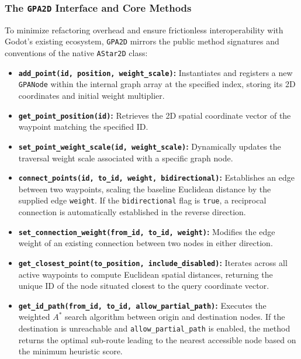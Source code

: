\subsubsection{The \texttt{GPA2D} Interface and Core Methods}
To minimize refactoring overhead and ensure frictionless interoperability with Godot's existing ecosystem, \texttt{GPA2D} mirrors the public method signatures and conventions of the native \texttt{AStar2D} class:

\begin{itemize}
    \item \textbf{\texttt{add\_point(id, position, weight\_scale)}:} Instantiates and registers a new \texttt{GPANode} within the internal graph array at the specified index, storing its 2D coordinates and initial weight multiplier.
    \item \textbf{\texttt{get\_point\_position(id)}:} Retrieves the 2D spatial coordinate vector of the waypoint matching the specified ID.
    \item \textbf{\texttt{set\_point\_weight\_scale(id, weight\_scale)}:} Dynamically updates the traversal weight scale associated with a specific graph node.
    \item \textbf{\texttt{connect\_points(id, to\_id, weight, bidirectional)}:} Establishes an edge between two waypoints, scaling the baseline Euclidean distance by the supplied edge \texttt{weight}. If the \texttt{bidirectional} flag is \texttt{true}, a reciprocal connection is automatically established in the reverse direction.
    \item \textbf{\texttt{set\_connection\_weight(from\_id, to\_id, weight)}:} Modifies the edge weight of an existing connection between two nodes in either direction.
    \item \textbf{\texttt{get\_closest\_point(to\_position, include\_disabled)}:} Iterates across all active waypoints to compute Euclidean spatial distances, returning the unique ID of the node situated closest to the query coordinate vector.
    \item \textbf{\texttt{get\_id\_path(from\_id, to\_id, allow\_partial\_path)}:} Executes the weighted $A^*$ search algorithm between origin and destination nodes. If the destination is unreachable and \texttt{allow\_partial\_path} is enabled, the method returns the optimal sub-route leading to the nearest accessible node based on the minimum heuristic score.
\end{itemize}

